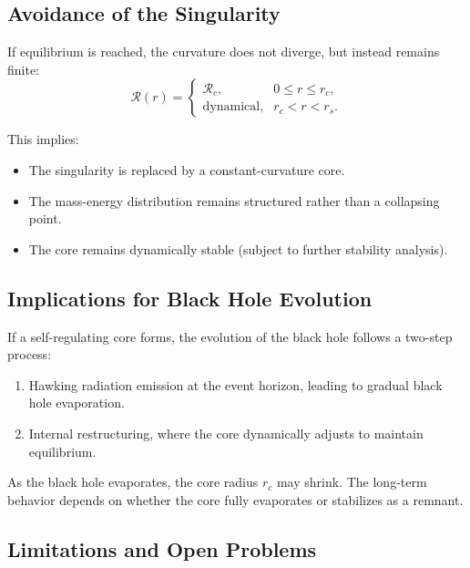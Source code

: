 \subsection{Avoidance of the Singularity}

If equilibrium is reached, the curvature does not diverge, but instead remains finite:
\begin{equation}
    \mathcal{R}(r) =
    \begin{cases}
        \mathcal{R}_c, & 0 \leq r \leq r_c, \\
        \text{dynamical}, & r_c < r < r_s.
    \end{cases}
\end{equation}

This implies:
\begin{itemize}
    \item The singularity is replaced by a constant-curvature core.
    \item The mass-energy distribution remains structured rather than a collapsing point.
    \item The core remains dynamically stable (subject to further stability analysis).
\end{itemize}

\subsection{Implications for Black Hole Evolution}

If a self-regulating core forms, the evolution of the black hole follows a two-step process:
\begin{enumerate}
    \item Hawking radiation emission at the event horizon, leading to gradual black hole evaporation.
    \item Internal restructuring, where the core dynamically adjusts to maintain equilibrium.
\end{enumerate}

As the black hole evaporates, the core radius \( r_c \) may shrink. The long-term behavior depends on whether the core fully evaporates or stabilizes as a remnant.

\subsection{Limitations and Open Problems}

